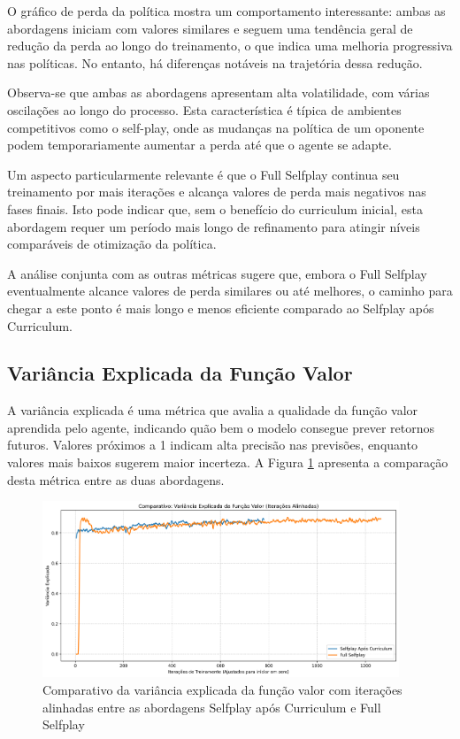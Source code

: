 O gráfico de perda da política mostra um comportamento interessante: ambas as abordagens iniciam com valores similares e seguem uma tendência geral de redução da perda ao longo do treinamento, o que indica uma melhoria progressiva nas políticas. No entanto, há diferenças notáveis na trajetória dessa redução.

Observa-se que ambas as abordagens apresentam alta volatilidade, com várias oscilações ao longo do processo. Esta característica é típica de ambientes competitivos como o self-play, onde as mudanças na política de um oponente podem temporariamente aumentar a perda até que o agente se adapte.

Um aspecto particularmente relevante é que o Full Selfplay continua seu treinamento por mais iterações e alcança valores de perda mais negativos nas fases finais. Isto pode indicar que, sem o benefício do curriculum inicial, esta abordagem requer um período mais longo de refinamento para atingir níveis comparáveis de otimização da política.

A análise conjunta com as outras métricas sugere que, embora o Full Selfplay eventualmente alcance valores de perda similares ou até melhores, o caminho para chegar a este ponto é mais longo e menos eficiente comparado ao Selfplay após Curriculum.

\subsection{Variância Explicada da Função Valor}

A variância explicada é uma métrica que avalia a qualidade da função valor aprendida pelo agente, indicando quão bem o modelo consegue prever retornos futuros. Valores próximos a 1 indicam alta precisão nas previsões, enquanto valores mais baixos sugerem maior incerteza. A Figura \ref{fig:explained_variance} apresenta a comparação desta métrica entre as duas abordagens.

\begin{figure}[H]
    \centering
    \includegraphics[width=0.95\textwidth]{fig/graficos_trabalho/graficos_experimentos/geral/comparativo_variancia_explicada_alinhado.png}
    \caption{Comparativo da variância explicada da função valor com iterações alinhadas entre as abordagens Selfplay após Curriculum e Full Selfplay}
    \label{fig:explained_variance}
\end{figure}

